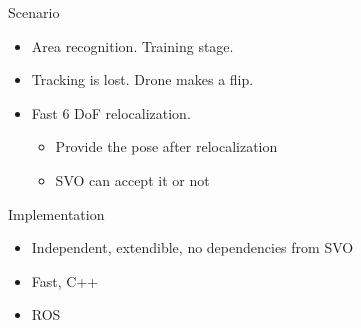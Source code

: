 \begin{frame}[t]{Scenario}
  \begin{itemize}
    \item Area recognition. Training stage. 
    \item Tracking is lost. Drone makes a flip.
    \item Fast 6 DoF relocalization.
      \begin{itemize}
        \item Provide the pose after relocalization
        \item SVO can accept it or not
      \end{itemize}
  \end{itemize}

  \begin{block}{Implementation}
    \begin{itemize}
      \item Independent, extendible, no dependencies from SVO
      \item Fast, C++
      \item ROS
    \end{itemize}
  \end{block}



\end{frame}

